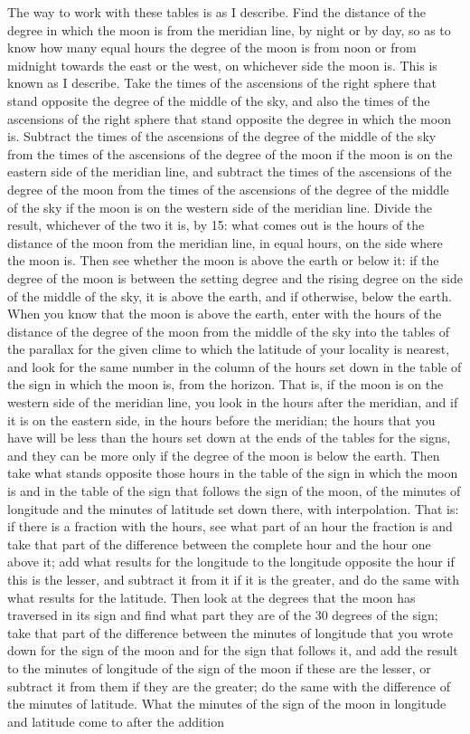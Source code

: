 \documentclass[11pt]{article}
\newcommand{\ArPage}[1]{\marginpar{\footnotesize\color{gray}Ar.\,p.\,#1}}
\begin{document}
\par \ArPage{125}The way to work with these tables is as I describe. Find the distance of the degree in which the moon is from the meridian line, by night or by day, so as to know how many equal hours the degree of the moon is from noon or from midnight towards the east or the west, on whichever side the moon is. This is known as I describe. Take the times of the ascensions of the right sphere that stand opposite the degree of the middle of the sky, and also the times of the ascensions of the right sphere that stand opposite the degree in which the moon is. Subtract the times of the ascensions of the degree of the middle of the sky from the times of the ascensions of the degree of the moon if the moon is on the eastern side of the meridian line, and subtract the times of the ascensions of the degree of the moon from the times of the ascensions of the degree of the middle of the sky if the moon is on the western side of the meridian line. Divide the result, whichever of the two it is, by 15: what comes out is the hours of the distance of the moon from the meridian line, in equal hours, on the side where the moon is. Then see whether the moon is above the earth or below it: if the degree of the moon is between the setting degree and the rising degree on the side of the middle of the sky, it is above the earth, and if otherwise, below the earth. When you know that the moon is above the earth, enter with the hours of the distance of the degree of the moon from the middle of the sky into the tables of the parallax for the given clime to which the latitude of your locality is nearest, and look for the same number in the column of the hours set down in the table of the sign in which the moon is, from the horizon. That is, if the moon is on the western side of the meridian line, you look in the hours after the meridian, and if it is on the eastern side, in the hours before the meridian; the hours that you have will be less than the hours set down at the ends of the tables for the signs, and they can be more only if the degree of the moon is below the earth. Then take what stands opposite those hours in the table of the sign in which the moon is and in the table of the sign that follows the sign of the moon, of the minutes of longitude and the minutes of latitude set down there, with interpolation. That is: if there is a fraction with the hours, see what part of an hour the fraction is and take that part of the difference between the complete hour and the hour one above it; add what results for the longitude to the longitude opposite the hour if this is the lesser, and subtract it from it if it is the greater, and do the same with what results for the latitude. Then look at the degrees that the moon has traversed in its sign and find what part they are of the 30 degrees of the sign; take that part of the difference between the minutes of longitude that you wrote down for the sign of the moon and for the sign that follows it, and add the result to the minutes of longitude of the sign of the moon if these are the lesser, or subtract it from them if they are the greater; do the same with the difference of the minutes of latitude. What the minutes of the sign of the moon in longitude and latitude come to after the addition 
\end{document}
